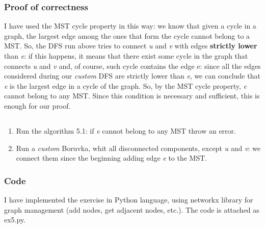 \documentclass[12pt]{article}
\begin{document}
\subsubsection{Proof of correctness}
I have used the MST cycle property in this way: we know that given a cycle in a graph, the largest edge among the ones that form the cycle cannot belong to a MST. So, the DFS run above tries to connect \textit{u} and \textit{v} with edges \textbf{strictly lower} than \textit{e}: if this happens, it means that there exist some cycle in the graph that connects \textit{u} and \textit{v} and, of course, such cycle contains the edge e: since all the edges considered during our \textit{custom} DFS are strictly lower than \textit{e}, we can conclude that \textit{e} is the largest edge in a cycle of the graph. So, by the MST cycle property, \textit{e} cannot belong to any MST. Since this condition is necessary and sufficient, this is enough for our proof.

\subsection{}
\begin{enumerate}
	\item Run the algorithm 5.1: if \textit{e} cannot belong to any MST throw an error.
	\item Run a \textit{custom} Boruvka, whit all disconnected components, except \textit{u} and \textit{v}: we connect them since the beginning adding edge \textit{e} to the MST.
\end{enumerate}

\subsubsection{Code}
I have implemented the exercise in Python language, using networkx library for graph management (add nodes, get adjacent nodes, etc.). The code is attached as ex5.py.
\end{document}
